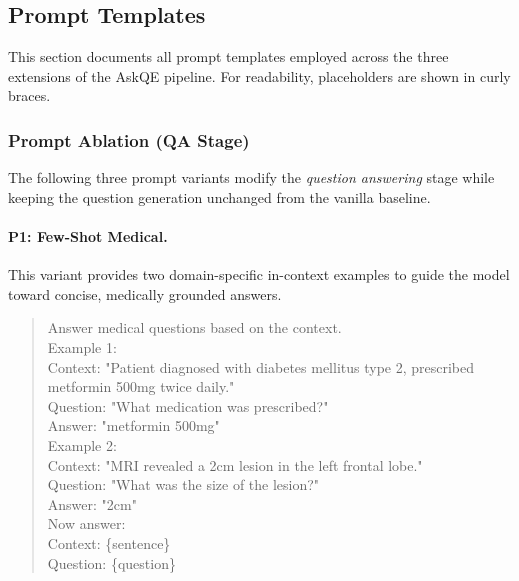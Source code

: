 
\subsection{Prompt Templates}
\label{sec:prompts}

This section documents all prompt templates employed across the three extensions of the AskQE pipeline. For readability, placeholders are shown in curly braces.



\subsubsection{Prompt Ablation (QA Stage)}
\label{sec:prompts_ablation}

The following three prompt variants modify the \textit{question answering} stage while keeping the question generation unchanged from the vanilla baseline.

\paragraph{P1: Few-Shot Medical.}
This variant provides two domain-specific in-context examples to guide the model toward concise, medically grounded answers.

\begin{quote}
\small\ttfamily
Answer medical questions based on the context.\\[4pt]
Example 1:\\
Context: "Patient diagnosed with diabetes mellitus type 2, prescribed metformin 500mg twice daily."\\
Question: "What medication was prescribed?"\\
Answer: "metformin 500mg"\\[4pt]
Example 2:\\
Context: "MRI revealed a 2cm lesion in the left frontal lobe."\\
Question: "What was the size of the lesion?"\\
Answer: "2cm"\\[4pt]
Now answer:\\
Context: \{sentence\}\\
Question: \{question\}
\end{quote}

